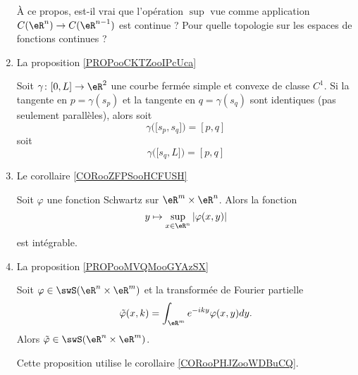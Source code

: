 \begin{enumerate}
À ce propos, est-il vrai que l'opération \( \sup\) vue comme application \( C(\eR^n)\to C(\eR^{n-1})\) est continue ? Pour quelle topologie sur les espaces de fonctions continues ?

\item La proposition \ref{PROPooCKTZooIPcUca}

\begin{proposition}   
    Soit \( \gamma\colon \mathopen[ 0 , L \mathclose]\to \eR^2\) une courbe fermée simple et convexe de classe \( C^1\). Si la tangente en \( p=\gamma(s_p)\) et la tangente en \( q=\gamma(s_q)\) sont identiques (pas seulement parallèles), alors soit 
    \begin{equation}
        \gamma\big( \mathopen[ s_p , s_q \mathclose] \big)=[p,q]
    \end{equation}
    soit
    \begin{equation}
        \gamma\big( \mathopen[ s_q , L \mathclose] \big)=[p,q]
    \end{equation}
\end{proposition}

\item
    Le corollaire \ref{CORooZFPSooHCFUSH}

    \begin{corollary}       \label{CORooPHJZooWDBuCQ}
    Soit \( \varphi\) une fonction Schwartz sur \( \eR^m\times \eR^n\). Alors la fonction
    \begin{equation}
        y\mapsto \sup_{x\in \eR^n}| \varphi(x,y) |
    \end{equation}
    est intégrable.
\end{corollary}

\item La proposition \ref{PROPooMVQMooGYAzSX}


\begin{proposition}
    Soit \( \varphi\in\swS(\eR^n\times \eR^m)\) et la transformée de Fourier partielle
    \begin{equation}
        \tilde \varphi(x,k)=\int_{\eR^m}  e^{-iky}\varphi(x,y)dy.
    \end{equation}
    Alors \( \tilde \varphi\in\swS(\eR^n\times \eR^m  )\).
\end{proposition}
Cette proposition utilise le corollaire \ref{CORooPHJZooWDBuCQ}.

\end{enumerate}

